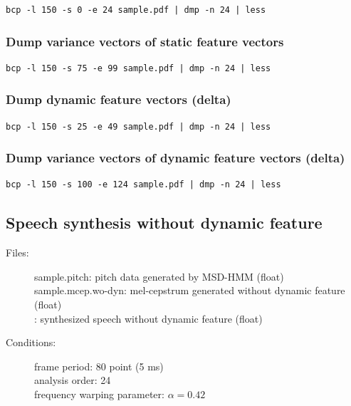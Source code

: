 \documentclass[a4paper]{article}
\begin{document}
\begin{verbatim}
bcp -l 150 -s 0 -e 24 sample.pdf | dmp -n 24 | less
\end{verbatim}

\subsubsection{Dump variance vectors of static feature vectors}

\begin{verbatim}
bcp -l 150 -s 75 -e 99 sample.pdf | dmp -n 24 | less
\end{verbatim}

\subsubsection{Dump dynamic feature vectors (delta)}

\begin{verbatim}
bcp -l 150 -s 25 -e 49 sample.pdf | dmp -n 24 | less
\end{verbatim}

\subsubsection{Dump variance vectors of dynamic feature vectors (delta)}

\begin{verbatim}
bcp -l 150 -s 100 -e 124 sample.pdf | dmp -n 24 | less
\end{verbatim}

\subsection{Speech synthesis without dynamic feature}

\begin{description}
\item[Files:]
  sample.pitch: pitch data generated by MSD-HMM (float)\\
  sample.mcep.wo-dyn: mel-cepstrum generated without dynamic
  feature (float) \\
  : 
  synthesized speech without dynamic feature (float)
\item[Conditions:]
  frame period: 80 point (5 ms)\\
  analysis order: 24\\
  frequency warping parameter: $\alpha = 0.42$
\end{description}
\end{document}
